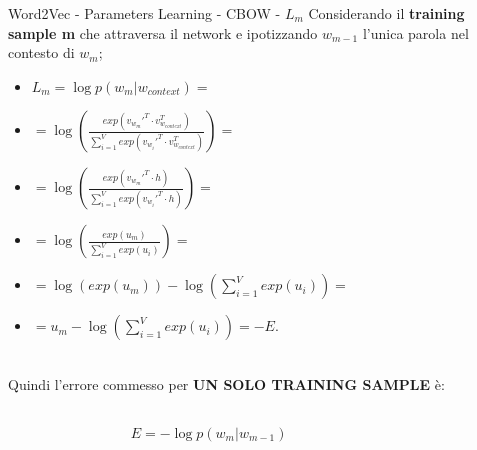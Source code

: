 \documentclass[british]{beamer}
\begin{document}
\begin{frame}{Word2Vec - Parameters Learning - CBOW - \(L_m\)}
	Considerando il \textbf{training sample m} che attraversa il network e ipotizzando \(w_{m-1}\) l'unica parola nel contesto di \(w_{m}\);
	\begin{itemize}
		\item \(L_m = \log p(w_{m}|w_{context}) = \)
		\item \(= \log \left( \frac{exp(v_{w_{m}}'^T \cdot v_{w_{context}}^T)}{\sum_{i=1}^{V} exp(v_{w_{i}}'^T \cdot v_{w_{context}}^T)} \right) =\) 
		\item \(= \log \left( \frac{exp(v_{w_{m}}'^T \cdot h)}{\sum_{i=1}^{V} exp(v_{w_{i}}'^T \cdot h)} \right) = \)
		\item \(= \log \left( \frac{exp(u_m)}{\sum_{i=1}^{V} exp(u_i)} \right) = \)
		\item \(= \log \left( exp(u_m) \right) - \log \left( \sum_{i=1}^{V} exp(u_i) \right) = \)
		\item \(= u_m - \log \left( \sum_{i=1}^{V} exp(u_i) \right) = -E. \)
		\\~\\
	\end{itemize}
	Quindi l'errore commesso per \textbf{UN SOLO TRAINING SAMPLE} \`{e}:
	\begin{columns}
		\begin{column}{0.3\textwidth}
			
		\end{column}
		\begin{column}{0.4\textwidth}
			\(E = -\log p(w_{m}|w_{m-1})\)
		\end{column}
		\begin{column}{0.3\textwidth}
			
		\end{column}
	\end{columns}
\end{frame}
\end{document}
